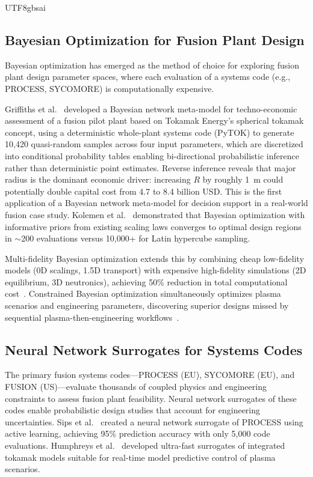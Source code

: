 \documentclass[12pt,a4paper]{article}
\begin{document}
\begin{CJK}{UTF8}{gbsai}
\subsection{Bayesian Optimization for Fusion Plant Design}

Bayesian optimization has emerged as the method of choice for exploring fusion plant design parameter spaces, where each evaluation of a systems code (e.g., PROCESS, SYCOMORE) is computationally expensive.

Griffiths et al.~\citep{Griffiths2025} developed a Bayesian network meta-model for techno-economic assessment of a fusion pilot plant based on Tokamak Energy's spherical tokamak concept, using a deterministic whole-plant systems code (PyTOK) to generate 10,420 quasi-random samples across four input parameters, which are discretized into conditional probability tables enabling bi-directional probabilistic inference rather than deterministic point estimates. Reverse inference reveals that major radius is the dominant economic driver: increasing $R$ by roughly 1~m could potentially double capital cost from 4.7 to 8.4 billion USD. This is the first application of a Bayesian network meta-model for decision support in a real-world fusion case study. Kolemen et al.~\citep{Kolemen2024BO} demonstrated that Bayesian optimization with informative priors from existing scaling laws converges to optimal design regions in $\sim$200 evaluations versus 10,000+ for Latin hypercube sampling.

Multi-fidelity Bayesian optimization extends this by combining cheap low-fidelity models (0D scalings, 1.5D transport) with expensive high-fidelity simulations (2D equilibrium, 3D neutronics), achieving 50\% reduction in total computational cost~\citep{Zanisi2024}. Constrained Bayesian optimization simultaneously optimizes plasma scenarios and engineering parameters, discovering superior designs missed by sequential plasma-then-engineering workflows~\citep{Creely2024}.

\subsection{Neural Network Surrogates for Systems Codes}

The primary fusion systems codes---PROCESS (EU), SYCOMORE (EU), and FUSION (US)---evaluate thousands of coupled physics and engineering constraints to assess fusion plant feasibility. Neural network surrogates of these codes enable probabilistic design studies that account for engineering uncertainties. Sips et al.~\citep{Sips2024} created a neural network surrogate of PROCESS using active learning, achieving 95\% prediction accuracy with only 5,000 code evaluations. Humphreys et al.~\citep{Humphreys2024} developed ultra-fast surrogates of integrated tokamak models suitable for real-time model predictive control of plasma scenarios.


\end{CJK}
\end{document}
